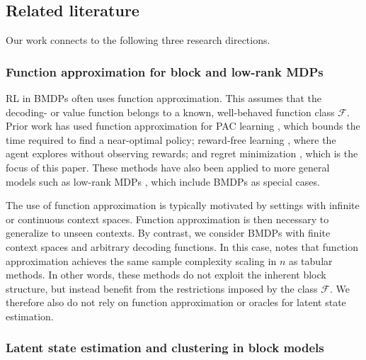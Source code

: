 \documentclass[11pt]{article}
\newcommand{\mcF}{\mathcal{F}}
\theoremstyle{definition}
\theoremstyle{definition}
\begin{document}
\subsection{Related literature}

Our work connects to the following three research directions.

\subsubsection{Function approximation for block and low-rank \texorpdfstring{\glspl{MDP}}{MDPs}}
\label{sec:related-literature:function-approximation}

\gls{RL} in \glspl{BMDP} often uses function approximation.
This assumes that the decoding- or value function belongs to a known, well-behaved function class $\mcF$.
Prior work has used function approximation for \gls{PAC} learning \cite{NIPS2016_2387337b,pmlr-v70-jiang17c,NEURIPS2018_5f0f5e5f,pmlr-v97-du19b,pmlr-v162-zhang22aa}, which bounds the time required to find a near-optimal policy; reward-free learning \cite{pmlr-v162-zhang22aa, pmlr-v119-misra20a}, where the agent explores without observing rewards; and regret minimization \cite{foster2020instancedependent}, which is the focus of this paper.
These methods have also been applied to more general models such as low-rank \glspl{MDP} \cite{agarwal2020flambe,DBLP:journals/corr/abs-2110-04652, modi2022modelfree, mhammedi2023efficient}, which include \glspl{BMDP} as special cases.

The use of function approximation is typically motivated by settings with infinite or continuous context spaces.
Function approximation is then necessary to generalize to unseen contexts.
By contrast, we consider \glspl{BMDP} with finite context spaces and arbitrary decoding functions.
In this case, \cite{Jedra:2022} notes that function approximation achieves the same sample complexity scaling in $n$ as tabular methods.
In other words, these methods do not exploit the inherent block structure, but instead benefit from the restrictions imposed by the class $\mcF$.
We therefore also do not rely on function approximation or oracles for latent state estimation.

\subsubsection{Latent state estimation and clustering in block models}
\end{document}
